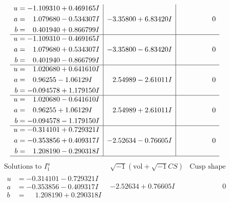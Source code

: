 \documentclass[1p]{elsarticle_modified}
\theoremstyle{definition}
\newcommand{\I}{\sqrt{-1}}
\begin{document}
$$\begin{array}{c|c|c}
\begin{aligned}
u &= -1.109310 + 0.469165 I \\
a &= \phantom{-}1.079680 - 0.534307 I \\
b &= \phantom{-}0.401940 + 0.866799 I\end{aligned}
 & -3.35800 + 6.83420 I & \phantom{-0.000000 } 0 \\ \hline\begin{aligned}
u &= -1.109310 - 0.469165 I \\
a &= \phantom{-}1.079680 + 0.534307 I \\
b &= \phantom{-}0.401940 - 0.866799 I\end{aligned}
 & -3.35800 - 6.83420 I & \phantom{-0.000000 } 0 \\ \hline\begin{aligned}
u &= \phantom{-}1.020680 + 0.641610 I \\
a &= \phantom{-}0.96255 - 1.06129 I \\
b &= -0.094578 + 1.179150 I\end{aligned}
 & \phantom{-}2.54989 - 2.61011 I & \phantom{-0.000000 } 0 \\ \hline\begin{aligned}
u &= \phantom{-}1.020680 - 0.641610 I \\
a &= \phantom{-}0.96255 + 1.06129 I \\
b &= -0.094578 - 1.179150 I\end{aligned}
 & \phantom{-}2.54989 + 2.61011 I & \phantom{-0.000000 } 0 \\ \hline\begin{aligned}
u &= -0.314101 + 0.729321 I \\
a &= -0.353856 + 0.409317 I \\
b &= \phantom{-}1.208190 - 0.290318 I\end{aligned}
 & -2.52634 - 0.76605 I & \phantom{-0.000000 } 0\\
 \hline 
 \end{array}$$\newpage$$\begin{array}{c|c|c}  
\text{Solutions to }I^u_{1}& \I (\text{vol} + \sqrt{-1}CS) & \text{Cusp shape}\\
 \hline 
\begin{aligned}
u &= -0.314101 - 0.729321 I \\
a &= -0.353856 - 0.409317 I \\
b &= \phantom{-}1.208190 + 0.290318 I\end{aligned}
 & -2.52634 + 0.76605 I & \phantom{-0.000000 } 0 \\ \hline\begin{aligned}

\end{aligned}
\end{array}$$
\end{document}
